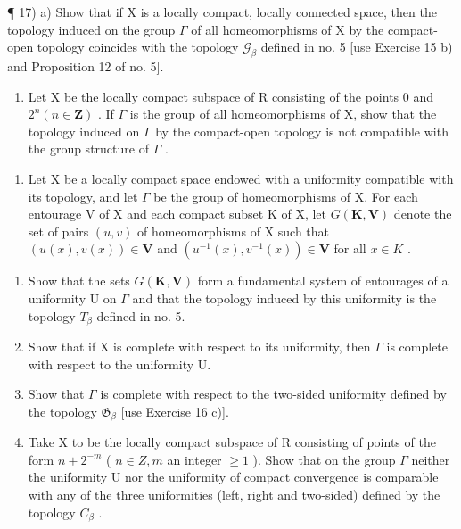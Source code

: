 ¶ 17) a) Show that if X is a locally compact, locally connected space, then the topology induced on the group \(\Gamma\) of all homeomorphisms of X by the compact-open topology coincides with the topology \(\mathcal{G}_{\beta}\) defined in no. 5 {[}use Exercise 15 b) and Proposition 12 of no. 5{]}.

\begin{enumerate}
\def\labelenumi{\alph{enumi})}
\setcounter{enumi}{1}
\tightlist
\item
  Let X be the locally compact subspace of R consisting of the points 0 and \(2^{n} (n \in \mathbf{Z})\) . If \(\Gamma\) is the group of all homeomorphisms of X, show that the topology induced on \(\Gamma\) by the compact-open topology is not compatible with the group structure of \(\Gamma\) .
\end{enumerate}

\begin{enumerate}
\def\labelenumi{\arabic{enumi})}
\setcounter{enumi}{17}
\tightlist
\item
  Let X be a locally compact space endowed with a uniformity compatible with its topology, and let \(\Gamma\) be the group of homeomorphisms of X. For each entourage V of X and each compact subset K of X, let \(G(\mathbf{K}, \mathbf{V})\) denote the set of pairs \((u, v)\) of homeomorphisms of X such that \((u(x), v(x)) \in \mathbf{V}\) and \((u^{-1}(x), v^{-1}(x)) \in \mathbf{V}\) for all \(x \in K\) .
\end{enumerate}

\begin{enumerate}
\def\labelenumi{\alph{enumi})}
\item
  Show that the sets \(G(\mathbf{K}, \mathbf{V})\) form a fundamental system of entourages of a uniformity U on \(\Gamma\) and that the topology induced by this uniformity is the topology \(T_{\beta}\) defined in no. 5.
\item
  Show that if X is complete with respect to its uniformity, then \(\Gamma\) is complete with respect to the uniformity U.
\item
  Show that \(\Gamma\) is complete with respect to the two-sided uniformity defined by the topology \(\mathfrak{G}_{\beta}\) {[}use Exercise 16 c){]}.
\item
  Take X to be the locally compact subspace of R consisting of points of the form \(n + 2^{-m}\) ( \(n \in Z, m\) an integer \(\geqslant 1\) ). Show that on the group \(\Gamma\) neither the uniformity U nor the uniformity of compact convergence is comparable with any of the three uniformities (left, right and two-sided) defined by the topology \(C_{\beta}\) .
\end{enumerate}

